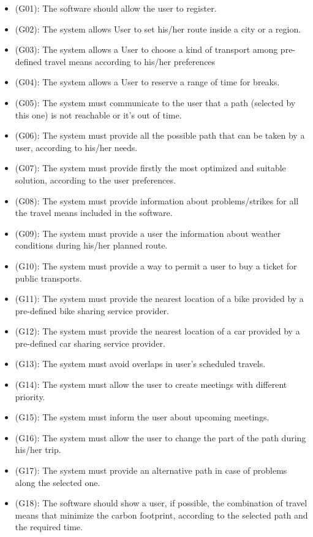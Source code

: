 \documentclass[a4paper,leqno]{book}
\begin{document}
\begin{itemize}
\item (G01): The software should allow the user to register.
\item (G02): The system allows User to set his/her route inside a city or a region.
\item (G03): The system allows a User to choose a kind of transport among pre-defined travel means according to his/her preferences
\item (G04): The system allows a User to reserve a range of time for breaks.
\item (G05): The system must communicate to the user that a path (selected by this one) is not reachable or it's out of time.
\item (G06): The system must provide all the possible path that can be taken by a user, according to his/her needs.
\item (G07): The system must provide firstly the most optimized and suitable solution, according to the user preferences.
\item (G08): The system must provide information about problems/strikes for all the travel means  included in the software.
\item (G09): The system must provide a user the information about weather conditions during his/her planned route.
\item (G10): The system must provide a way to permit a user to buy a ticket for public transports.
\item (G11): The system must provide the nearest location of a bike provided by a pre-defined bike sharing service provider.
\item (G12): The system must provide the nearest location of a car provided by a pre-defined car sharing service provider.
\item (G13): The system must avoid overlaps in user's scheduled travels.
\item (G14): The system must allow the user to create meetings with different priority.
\item (G15): The system must inform the user about upcoming meetings.
\item (G16): The system must allow the user to change the part of the path during his/her trip.
\item (G17): The system must provide an alternative path in case of problems along the selected one.
\item (G18): The software should show a user, if possible, the combination of travel means that minimize the carbon footprint, according to the selected path and the required time.

\end{itemize}
\end{document}
